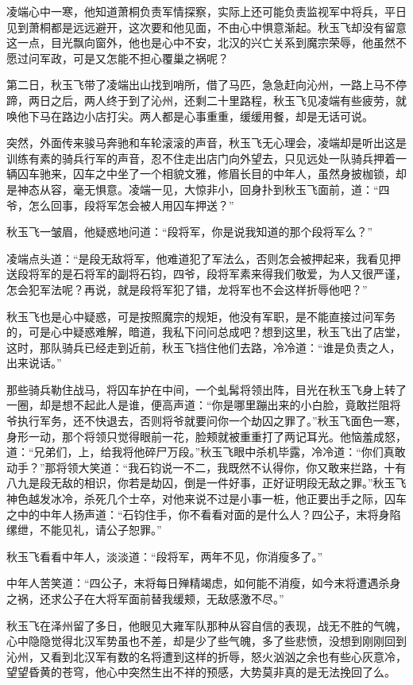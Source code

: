 凌端心中一寒，他知道萧桐负责军情探察，实际上还可能负责监视军中将兵，平日见到萧桐都是远远避开，这次要和他见面，不由心中惧意渐起。秋玉飞却没有留意这一点，目光飘向窗外，他也是心中不安，北汉的兴亡关系到魔宗荣辱，他虽然不愿过问军政，可是又怎能不担心覆巢之祸呢？

第二日，秋玉飞带了凌端出山找到哨所，借了马匹，急急赶向沁州，一路上马不停蹄，两日之后，两人终于到了沁州，还剩二十里路程，秋玉飞见凌端有些疲劳，就唤他下马在路边小店打尖。两人都是心事重重，缓缓用餐，却是无话可说。

突然，外面传来骏马奔驰和车轮滚滚的声音，秋玉飞无心理会，凌端却是听出这是训练有素的骑兵行军的声音，忍不住走出店门向外望去，只见远处一队骑兵押着一辆囚车驰来，囚车之中坐了一个相貌文雅，修眉长目的中年人，虽然身披枷锁，却是神态从容，毫无惧意。凌端一见，大惊非小，回身扑到秋玉飞面前，道：“四爷，怎么回事，段将军怎会被人用囚车押送？”

秋玉飞一皱眉，他疑惑地问道：“段将军，你是说我知道的那个段将军么？”

凌端点头道：“是段无敌将军，他难道犯了军法么，否则怎会被押起来，我看见押送段将军的是石将军的副将石钧，四爷，段将军素来得我们敬爱，为人又很严谨，怎会犯军法呢？再说，就是段将军犯了错，龙将军也不会这样折辱他吧？”

秋玉飞也是心中疑惑，可是按照魔宗的规矩，他没有军职，是不能直接过问军务的，可是心中疑惑难解，暗道，我私下问问总成吧？想到这里，秋玉飞出了店堂，这时，那队骑兵已经走到近前，秋玉飞挡住他们去路，冷冷道：“谁是负责之人，出来说话。”

那些骑兵勒住战马，将囚车护在中间，一个虬髯将领出阵，目光在秋玉飞身上转了一圈，却是想不起此人是谁，便高声道：“你是哪里蹦出来的小白脸，竟敢拦阻将爷执行军务，还不快退去，否则将爷就要问你一个劫囚之罪了。”秋玉飞面色一寒，身形一动，那个将领只觉得眼前一花，脸颊就被重重打了两记耳光。他恼羞成怒，道：“兄弟们，上，给我将他碎尸万段。”秋玉飞眼中杀机毕露，冷冷道：“你们真敢动手？”那将领大笑道：“我石钧说一不二，我既然不认得你，你又敢来拦路，十有八九是段无敌的相识，你若是劫囚，倒是一件好事，正好证明段无敌之罪。”秋玉飞神色越发冰冷，杀死几个士卒，对他来说不过是小事一桩，他正要出手之际，囚车之中的中年人扬声道：“石钧住手，你不看看对面的是什么人？四公子，末将身陷缧绁，不能见礼，请公子恕罪。”

秋玉飞看看中年人，淡淡道：“段将军，两年不见，你消瘦多了。”

中年人苦笑道：“四公子，末将每日殚精竭虑，如何能不消瘦，如今末将遭遇杀身之祸，还求公子在大将军面前替我缓颊，无敌感激不尽。”

秋玉飞在泽州留了多日，他眼见大雍军队那种从容自信的表现，战无不胜的气魄，心中隐隐觉得北汉军势虽也不差，却是少了些气魄，多了些悲愤，没想到刚刚回到沁州，又看到北汉军有数的名将遭到这样的折辱，怒火汹汹之余也有些心灰意冷，望望昏黄的苍穹，他心中突然生出不祥的预感，大势莫非真的是无法挽回了么。

